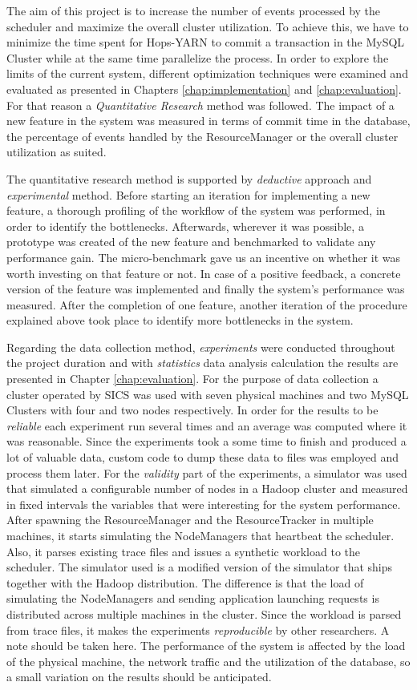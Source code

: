 The aim of this project is to increase the number of events processed
by the scheduler and maximize the overall cluster utilization.
To achieve this, we have to minimize the time spent for
Hops-YARN to commit a transaction in the MySQL Cluster while at the
same time parallelize the process. In order to explore
the limits of the current system, different optimization techniques
were examined and evaluated as presented in Chapters
\ref{chap:implementation} and \ref{chap:evaluation}. For that reason a
\emph{Quantitative Research} method was followed. The impact of a new
feature in the system was measured in terms of commit time in the
database, the percentage of events handled by the ResourceManager or
the overall cluster utilization as suited.

The quantitative research method is supported by \emph{deductive}
approach and \emph{experimental} method. Before starting an iteration for
implementing a new feature, a thorough profiling of the
workflow of the system was performed, in order to identify the bottlenecks. Afterwards,
wherever it was possible, a prototype was created of the new
feature and benchmarked to validate any performance
gain. The micro-benchmark gave us an incentive on whether it was worth
investing on that feature or not. In case of a positive feedback,
a concrete version of the feature was implemented and finally the system's
performance was measured. After the completion of one feature, another iteration of the
procedure explained above took place to identify more bottlenecks in the system.

Regarding the data collection method, \emph{experiments} were
conducted throughout the project duration and with \emph{statistics}
data analysis calculation the results are presented in Chapter
\ref{chap:evaluation}. For the purpose of data collection a
cluster operated by SICS was used with seven physical machines and two MySQL
Clusters with four and two nodes respectively. In order for the
results to be \emph{reliable} each experiment run several times and
an average was computed where it was reasonable. Since the experiments took a
some time to finish and produced a lot of valuable data, custom
code to dump these data to files was employed and process them later. For the
\emph{validity} part of the experiments, a simulator was used that
simulated a configurable number of nodes in a Hadoop cluster and
measured in fixed intervals the variables that were interesting for
the system performance. After spawning the ResourceManager and the
ResourceTracker in multiple machines, it starts simulating the
NodeManagers that heartbeat the scheduler. Also, it parses existing
trace files and issues a synthetic workload to the scheduler. The simulator used is a
modified version of the simulator that ships together with the Hadoop
distribution. The difference is that the load of simulating the
NodeManagers and sending application launching requests is distributed across
multiple machines in the cluster. Since the workload is parsed from
trace files, it makes the experiments \emph{reproducible} by other
researchers. A note should be taken here. The performance of the system is affected
by the load of the physical machine, the network traffic and the
utilization of the database, so a small variation on the results
should be anticipated.
